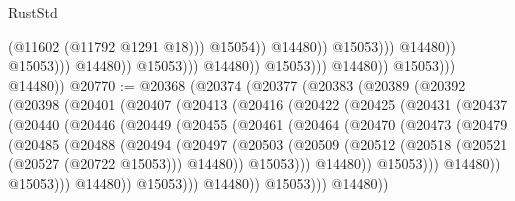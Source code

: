 \begin{lexlean}{RustStd}
\begin{coremodule}
                                                                (@11602 (@11792 @1291 @18)))
                                                              @15054))
                                                          @14480))
                                                      @15053)))
                                                @14480))
                                            @15053)))
                                      @14480))
                                  @15053)))
                            @14480))
                        @15053)))
                  @14480))
              @15053)))
        @14480))
@20770 := @20368
    (@20374
      (@20377
        (@20383
          (@20389
            (@20392
              (@20398
                (@20401
                  (@20407
                    (@20413
                      (@20416
                        (@20422
                          (@20425
                            (@20431
                              (@20437
                                (@20440
                                  (@20446
                                    (@20449
                                      (@20455
                                        (@20461
                                          (@20464
                                            (@20470
                                              (@20473
                                                (@20479
                                                  (@20485
                                                    (@20488
                                                      (@20494
                                                        (@20497
                                                          (@20503
                                                            (@20509
                                                              (@20512
                                                                (@20518
                                                                  (@20521 (@20527 (@20722 @15053)))
                                                                  @14480))
                                                              @15053)))
                                                        @14480))
                                                    @15053)))
                                              @14480))
                                          @15053)))
                                    @14480))
                                @15053)))
                          @14480))
                      @15053)))
                @14480))

\end{coremodule}
\end{lexlean}
